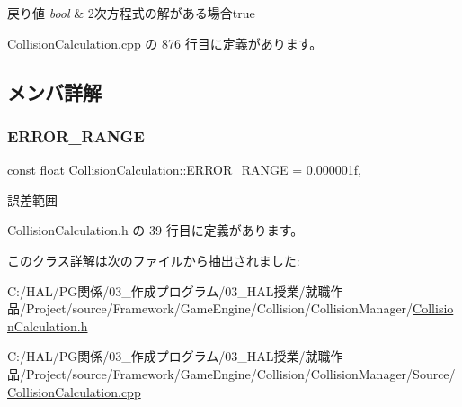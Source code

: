 \begin{DoxyRetVals}{戻り値}
{\em bool} & 2次方程式の解がある場合true \\
\hline
\end{DoxyRetVals}


 Collision\+Calculation.\+cpp の 876 行目に定義があります。



\subsection{メンバ詳解}
\mbox{\label{class_collision_calculation_a6f6b9027419102e1ac9dc56f81f87ceb}} 
\subsubsection{\texorpdfstring{E\+R\+R\+O\+R\+\_\+\+R\+A\+N\+GE}{ERROR\_RANGE}}
{\footnotesize\ttfamily const float Collision\+Calculation\+::\+E\+R\+R\+O\+R\+\_\+\+R\+A\+N\+GE = 0.\+000001f\hspace{0.3cm}{\ttfamily [static]}, {\ttfamily [private]}}



誤差範囲 



 Collision\+Calculation.\+h の 39 行目に定義があります。



このクラス詳解は次のファイルから抽出されました\+:\begin{DoxyCompactItemize}
\item 
C\+:/\+H\+A\+L/\+P\+G関係/03\+\_\+作成プログラム/03\+\_\+\+H\+A\+L授業/就職作品/\+Project/source/\+Framework/\+Game\+Engine/\+Collision/\+Collision\+Manager/\mbox{\hyperlink{_collision_calculation_8h}{Collision\+Calculation.\+h}}\item 
C\+:/\+H\+A\+L/\+P\+G関係/03\+\_\+作成プログラム/03\+\_\+\+H\+A\+L授業/就職作品/\+Project/source/\+Framework/\+Game\+Engine/\+Collision/\+Collision\+Manager/\+Source/\mbox{\hyperlink{_collision_calculation_8cpp}{Collision\+Calculation.\+cpp}}\end{DoxyCompactItemize}
